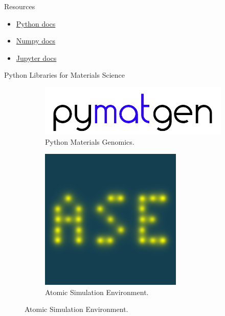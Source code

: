 \documentclass[aspectratio=169]{beamer}
\begin{document}
\begin{frame}{Resources}
\begin{itemize}
    \item \href{https://www.python.org/doc/ }{Python docs}
    \item \href{http://docs.scipy.org/doc/numpy/reference/ }{Numpy docs}
    \item \href{https://docs.jupyter.org/en/latest/start/index.html}{Jupyter docs}
\end{itemize}
\end{frame} 

\begin{frame}{Python Libraries for Materials Science}
\begin{figure}
    \centering
    \begin{subfigure}{0.7\textwidth}
        \centering
        \includegraphics[width=\linewidth]{lectures/figures/9_pymatgen.png}
    \caption{Python Materials Genomics.\cite{ongPythonMaterialsGenomics2013}}
    \end{subfigure}
    \begin{subfigure}{0.2\textwidth}
        \centering
        \includegraphics[width=\linewidth]{lectures/figures/9_ASE.png}
    \caption{Atomic Simulation Environment.}
    \end{subfigure}
\end{figure} 
\end{frame} 
\end{document}

